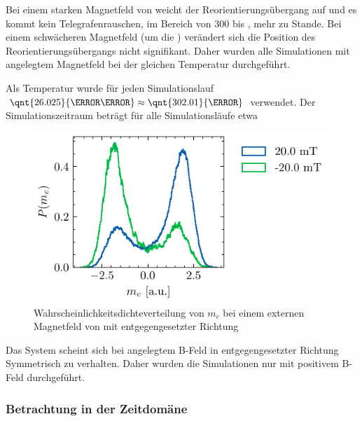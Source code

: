 \documentclass[main.tex]{subfiles}
\begin{document}
Bei einem starken Magnetfeld von  weicht der Reorientierungsübergang auf und es kommt kein Telegrafenrauschen, im Bereich von \num{300} bis , mehr zu Stande. Bei einem schwächeren Magnetfeld (um die ) verändert sich die Position des Reorientierungsübergangs nicht signifikant. Daher wurden alle Simulationen mit angelegtem Magnetfeld bei der gleichen Temperatur durchgeführt.

Als Temperatur wurde für jeden Simulationslauf \( \qnt{26.025}{\milli\electronvolt} \approx \qnt{302.01}{\kelvin}\) verwendet.
Der Simulationszeitraum beträgt für alle Simulationsläufe etwa 

\begin{figure}[H]
    \centering
    \includegraphics{bilder/plots/Bz_sign_comparison/20mT_hist_comp.pdf}
    \caption{Wahrscheinlichkeitsdichteverteilung von \(m_c\) bei einem externen Magnetfeld von  mit entgegengesetzter Richtung}\label{fig:bc-sign-hist}
\end{figure}

Das System scheint sich bei angelegtem B-Feld in entgegengesetzter Richtung Symmetrisch zu verhalten. Daher wurden die Simulationen nur mit positivem B-Feld durchgeführt.


\subsubsection{Betrachtung in der Zeitdomäne}
\end{document}
